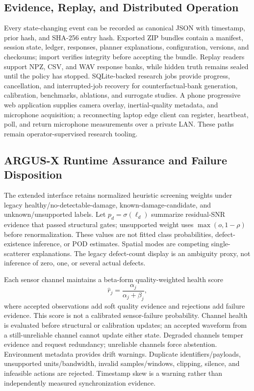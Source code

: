 \documentclass[conference]{IEEEtran}
\begin{document}
\subsection{Evidence, Replay, and Distributed Operation}
Every state-changing event can be recorded as canonical JSON with timestamp, prior hash, and SHA-256 entry hash. Exported ZIP bundles contain a manifest, session state, ledger, responses, planner explanations, configuration, versions, and checksums; import verifies integrity before accepting the bundle. Replay readers support NPZ, CSV, and WAV response banks, while hidden truth remains sealed until the policy has stopped. SQLite-backed research jobs provide progress, cancellation, and interrupted-job recovery for counterfactual-bank generation, calibration, benchmarks, ablations, and surrogate studies. A phone progressive web application supplies camera overlay, inertial-quality metadata, and microphone acquisition; a reconnecting laptop edge client can register, heartbeat, poll, and return microphone measurements over a private LAN. These paths remain operator-supervised research tooling.

\subsection{ARGUS-X Runtime Assurance and Failure Disposition}
The extended interface retains normalized heuristic screening weights under legacy healthy/no-detectable-damage, known-damage-candidate, and unknown/unsupported labels. Let $p_d=\sigma(\ell_d)$ summarize residual-SNR evidence that passed structural gates; unsupported weight uses $\max(o,1-\rho)$ before renormalization. These values are not fitted class probabilities, defect-existence inference, or POD estimates. Spatial modes are competing single-scatterer explanations. The legacy defect-count display is an ambiguity proxy, not inference of zero, one, or several actual defects.

Each sensor channel maintains a beta-form quality-weighted health score
\begin{equation}
\hat r_j=\frac{\alpha_j}{\alpha_j+\beta_j},
\end{equation}
where accepted observations add soft quality evidence and rejections add failure evidence. This score is not a calibrated sensor-failure probability. Channel health is evaluated before structural or calibration updates; an accepted waveform from a still-unreliable channel cannot update either state. Degraded channels temper evidence and request redundancy; unreliable channels force abstention. Environment metadata provides drift warnings. Duplicate identifiers/payloads, unsupported units/bandwidth, invalid samples/windows, clipping, silence, and infeasible actions are rejected. Timestamp skew is a warning rather than independently measured synchronization evidence.
\end{document}
